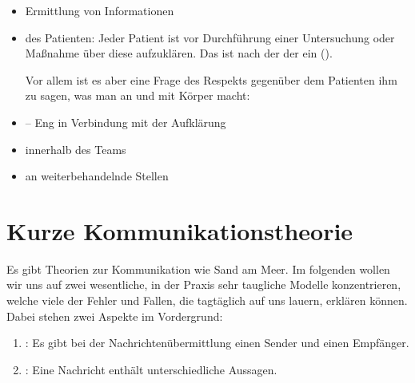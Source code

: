 \begin{itemize}
  \item Ermittlung von Informationen
  \item {} des Patienten: Jeder Patient ist vor
  Durchführung einer Untersuchung oder Maßnahme über
  diese aufzuklären.
  Das  ist nach der
   der  ein 
  ().
  
  Vor allem ist es aber eine Frage des Respekts  gegenüber
  dem Patienten ihm zu sagen, was man an und mit 
  Körper macht:
  \item {} -- Eng in Verbindung mit
  der Aufklärung
  \item {} innerhalb des Teams
  \item {} an weiterbehandelnde
  Stellen
\end{itemize}

\section{Kurze Kommunikationstheorie}

Es gibt Theorien zur Kommunikation wie Sand am Meer. Im
folgenden wollen wir uns auf zwei wesentliche, in der Praxis
sehr taugliche Modelle konzentrieren, welche viele der
Fehler und Fallen, die tagtäglich auf uns lauern, erklären
können. Dabei stehen zwei Aspekte im Vordergrund:
\begin{enumerate}
  \item {}: Es gibt bei der
  Nachrichtenübermittlung einen Sender und einen Empfänger.
  \item {}: Eine Nachricht enthält
  unterschiedliche Aussagen.
\end{enumerate}

